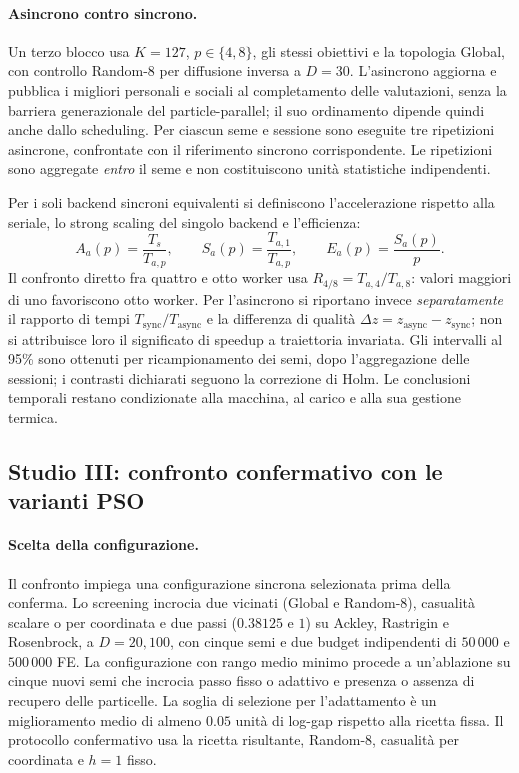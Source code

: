 \paragraph{Asincrono contro sincrono.}
Un terzo blocco usa $K=127$, $p\in\{4,8\}$, gli stessi obiettivi e la topologia Global, con controllo Random-8 per diffusione inversa a $D=30$. L'asincrono aggiorna e pubblica i migliori personali e sociali al completamento delle valutazioni, senza la barriera generazionale del particle-parallel; il suo ordinamento dipende quindi anche dallo scheduling. Per ciascun seme e sessione sono eseguite tre ripetizioni asincrone, confrontate con il riferimento sincrono corrispondente. Le ripetizioni sono aggregate \emph{entro} il seme e non costituiscono unità statistiche indipendenti.

Per i soli backend sincroni equivalenti si definiscono l'accelerazione rispetto alla seriale, lo strong scaling del singolo backend e l'efficienza:
\begin{equation}
 A_a(p)=\frac{T_s}{T_{a,p}},\qquad
 S_a(p)=\frac{T_{a,1}}{T_{a,p}},\qquad
 E_a(p)=\frac{S_a(p)}{p}.
 \label{eq:speedup-efficiency}
\end{equation}
Il confronto diretto fra quattro e otto worker usa $R_{4/8}=T_{a,4}/T_{a,8}$: valori maggiori di uno favoriscono otto worker. Per l'asincrono si riportano invece \emph{separatamente} il rapporto di tempi $T_{\mathrm{sync}}/T_{\mathrm{async}}$ e la differenza di qualità $\Delta z=z_{\mathrm{async}}-z_{\mathrm{sync}}$; non si attribuisce loro il significato di speedup a traiettoria invariata. Gli intervalli al 95\% sono ottenuti per ricampionamento dei semi, dopo l'aggregazione delle sessioni; i contrasti dichiarati seguono la correzione di Holm. Le conclusioni temporali restano condizionate alla macchina, al carico e alla sua gestione termica.

\subsection{Studio III: confronto confermativo con le varianti PSO}\label{subsec:exp-pso}
\paragraph{Scelta della configurazione.}
Il confronto impiega una configurazione sincrona selezionata prima della conferma. Lo screening incrocia due vicinati (Global e Random-8), casualità scalare o per coordinata e due passi ($0.38125$ e $1$) su Ackley, Rastrigin e Rosenbrock, a $D=20,100$, con cinque semi e due budget indipendenti di $50\,000$ e $500\,000$ FE. La configurazione con rango medio minimo procede a un'ablazione su cinque nuovi semi che incrocia passo fisso o adattivo e presenza o assenza di recupero delle particelle. La soglia di selezione per l'adattamento è un miglioramento medio di almeno $0.05$ unità di log-gap rispetto alla ricetta fissa. Il protocollo confermativo usa la ricetta risultante, Random-8, casualità per coordinata e $h=1$ fisso.

